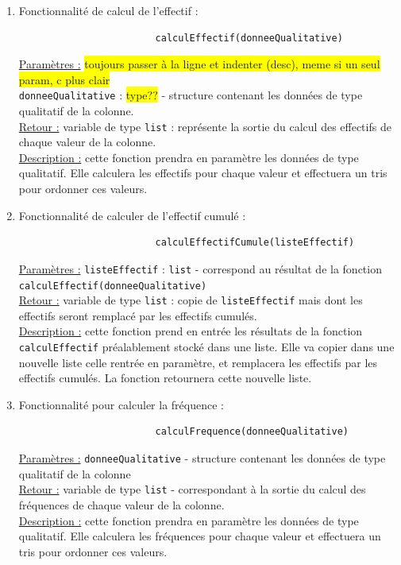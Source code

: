			\begin{enumerate}
				\vspace{1em}\item Fonctionnalité de calcul de l'effectif :
					\begin{lstlisting}
						calculEffectif(donneeQualitative)
					\end{lstlisting}
					\underline{Paramètres :} 
					\colorbox{yellow}{toujours passer à la ligne et indenter (desc), meme si un seul param, c plus clair}\\
						\lstinline!donneeQualitative! : \colorbox{yellow}{type??} - structure contenant les données de type qualitatif de la colonne.\\
					\underline{Retour :} variable de type  \lstinline!list! : représente la sortie du calcul des effectifs de chaque valeur de la colonne.\\
					\underline{Description :} cette fonction prendra en paramètre les données de type qualitatif. Elle calculera les effectifs pour chaque valeur et effectuera un tris pour ordonner ces valeurs.
					
				\vspace{1em}\item Fonctionnalité de calculer de l'effectif cumulé :
					\begin{lstlisting}
						calculEffectifCumule(listeEffectif)
					\end{lstlisting}
					\underline{Paramètres :} \lstinline!listeEffectif! : \lstinline!list! - correspond au résultat de la fonction \lstinline!calculEffectif(donneeQualitative)!\\
					\underline{Retour :} variable de type  \lstinline!list! : copie de \lstinline!listeEffectif! mais dont les effectifs seront remplacé par les effectifs cumulés. \\
					\underline{Description :} cette fonction prend en entrée les résultats de la fonction \lstinline!calculEffectif! préalablement stocké dans une liste. Elle va copier dans une nouvelle liste celle rentrée en paramètre, et remplacera les effectifs par les effectifs cumulés. La fonction retournera cette nouvelle liste.
					
				\vspace{1em}\item Fonctionnalité pour calculer la fréquence :
					\begin{lstlisting}
						calculFrequence(donneeQualitative)
					\end{lstlisting}
					\underline{Paramètres :} \lstinline!donneeQualitative! - structure contenant les données de type qualitatif de la colonne\\
					\underline{Retour :} variable de type  \lstinline!list! - correspondant à la sortie du calcul des fréquences de chaque valeur de la colonne.\\
					\underline{Description :} cette fonction prendra en paramètre les données de type qualitatif. Elle calculera les fréquences pour chaque valeur et effectuera un tris pour ordonner ces valeurs.
					

\end{enumerate}
